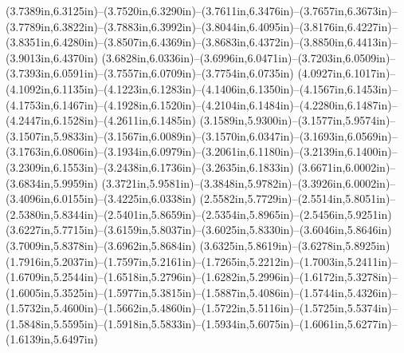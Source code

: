 (3.7389in,6.3125in)--(3.7520in,6.3290in)--(3.7611in,6.3476in)--(3.7657in,6.3673in)--(3.7789in,6.3822in)--(3.7883in,6.3992in)--(3.8044in,6.4095in)--(3.8176in,6.4227in)--(3.8351in,6.4280in)--(3.8507in,6.4369in)--(3.8683in,6.4372in)--(3.8850in,6.4413in)--(3.9013in,6.4370in) (3.6828in,6.0336in)--(3.6996in,6.0471in)--(3.7203in,6.0509in)--(3.7393in,6.0591in)--(3.7557in,6.0709in)--(3.7754in,6.0735in) (4.0927in,6.1017in)--(4.1092in,6.1135in)--(4.1223in,6.1283in)--(4.1406in,6.1350in)--(4.1567in,6.1453in)--(4.1753in,6.1467in)--(4.1928in,6.1520in)--(4.2104in,6.1484in)--(4.2280in,6.1487in)--(4.2447in,6.1528in)--(4.2611in,6.1485in) (3.1589in,5.9300in)--(3.1577in,5.9574in)--(3.1507in,5.9833in)--(3.1567in,6.0089in)--(3.1570in,6.0347in)--(3.1693in,6.0569in)--(3.1763in,6.0806in)--(3.1934in,6.0979in)--(3.2061in,6.1180in)--(3.2139in,6.1400in)--(3.2309in,6.1553in)--(3.2438in,6.1736in)--(3.2635in,6.1833in) (3.6671in,6.0002in)--(3.6834in,5.9959in) (3.3721in,5.9581in)--(3.3848in,5.9782in)--(3.3926in,6.0002in)--(3.4096in,6.0155in)--(3.4225in,6.0338in) (2.5582in,5.7729in)--(2.5514in,5.8051in)--(2.5380in,5.8344in)--(2.5401in,5.8659in)--(2.5354in,5.8965in)--(2.5456in,5.9251in) (3.6227in,5.7715in)--(3.6159in,5.8037in)--(3.6025in,5.8330in)--(3.6046in,5.8646in) (3.7009in,5.8378in)--(3.6962in,5.8684in) (3.6325in,5.8619in)--(3.6278in,5.8925in) (1.7916in,5.2037in)--(1.7597in,5.2161in)--(1.7265in,5.2212in)--(1.7003in,5.2411in)--(1.6709in,5.2544in)--(1.6518in,5.2796in)--(1.6282in,5.2996in)--(1.6172in,5.3278in)--(1.6005in,5.3525in)--(1.5977in,5.3815in)--(1.5887in,5.4086in)--(1.5744in,5.4326in)--(1.5732in,5.4600in)--(1.5662in,5.4860in)--(1.5722in,5.5116in)--(1.5725in,5.5374in)--(1.5848in,5.5595in)--(1.5918in,5.5833in)--(1.5934in,5.6075in)--(1.6061in,5.6277in)--(1.6139in,5.6497in)

